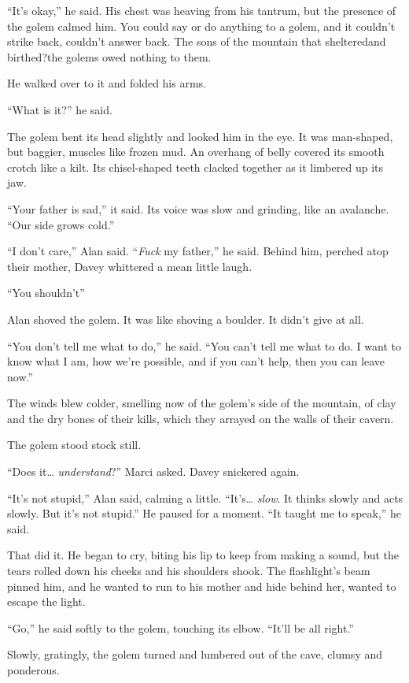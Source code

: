 ``It's okay,'' he said.  His chest was heaving from his tantrum, but
the presence of the golem calmed him.  You could say or do anything to
a golem, and it couldn't strike back, couldn't answer back.  The sons
of the mountain that sheltered\dash{}and birthed?\dash{}the golems owed
nothing to them.

He walked over to it and folded his arms.

``What is it?'' he said.

The golem bent its head slightly and looked him in the eye.  It was
man-shaped, but baggier, muscles like frozen mud.  An overhang of
belly covered its smooth crotch like a kilt.  Its chisel-shaped teeth
clacked together as it limbered up its jaw.

``Your father is sad,'' it said.  Its voice was slow and grinding,
like an avalanche.  ``Our side grows cold.''

``I don't care,'' Alan said.  ``\textit{Fuck} my father,'' he said. 
Behind him, perched atop their mother, Davey whittered a mean little
laugh.

``You shouldn't\dash{}''

Alan shoved the golem.  It was like shoving a boulder.  It didn't give
at all.

``You don't tell me what to do,'' he said.  ``You can't tell me what
to do.  I want to know what I am, how we're possible, and if you can't
help, then you can leave now.''

The winds blew colder, smelling now of the golem's side of the
mountain, of clay and the dry bones of their kills, which they arrayed
on the walls of their cavern.

The golem stood stock still.

``Does it\ldots{}  \textit{understand}?'' Marci asked.  Davey snickered
again.

``It's not stupid,'' Alan said, calming a little.  ``It's\ldots{} 
\textit{slow}.  It thinks slowly and acts slowly.  But it's not
stupid.'' He paused for a moment.  ``It taught me to speak,'' he said.

That did it.  He began to cry, biting his lip to keep from making a
sound, but the tears rolled down his cheeks and his shoulders shook. 
The flashlight's beam pinned him, and he wanted to run to his mother
and hide behind her, wanted to escape the light.

``Go,'' he said softly to the golem, touching its elbow.  ``It'll be
all right.''

Slowly, gratingly, the golem turned and lumbered out of the cave,
clumsy and ponderous.


